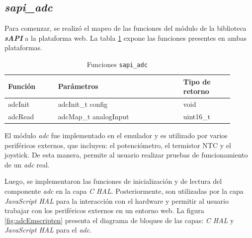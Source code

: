 \hfill \break
\hfill \break
\hfill \break
\hfill \break

\subsection{\textit{\textbf{sapi\_adc}}}

Para comenzar, se realizó el mapeo de las funciones del módulo de la biblioteca \textit{\textbf{sAPI}} a la plataforma web. La tabla \ref{tab:sapiADC} expone las funciones presentes en ambas plataformas.


\begin{table}[h]
	\centering
	\caption[Funciones \texttt{sapi\_adc}]{Funciones \texttt{sapi\_adc}}
	\begin{tabular}{p{0.20\linewidth} p{0.50\linewidth}  p{0.20\linewidth}}    
		\toprule
		\textbf{Función} 	 & \textbf{Parámetros} 		& \textbf{Tipo de retorno}  \\
		\midrule
		adcInit & adcInit\_t config		&  void \\		
		adcRead	 & adcMap\_t analogInput	&  uint16\_t \\
		\bottomrule
		\hline
	\end{tabular}
	\label{tab:sapiADC}
\end{table}

El módulo \textit{adc} fue implementado en el emulador  y es utilizado por varios periféricos externos, que incluyen: el potenciómetro, el termistor NTC y el joystick. De esta manera, permite al usuario realizar pruebas de funcionamiento de un \textit{adc} real. 

Luego, se implementaron las funciones de inicialización y de lectura del componente \textit{adc}  en la capa \textit{C HAL}. Posteriormente, son utilizadas por la capa \textit{JavaScript HAL} para la interacción con el hardware y permitir al usuario trabajar con los periféricos externos en un entorno web. La figura \ref{fig:adcEmscripten} presenta el diagrama de bloques de las capas: \textit{C HAL} y \textit{JavaScript HAL} para el \textit{adc}.

